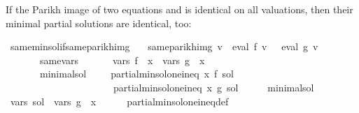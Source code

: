 \begin{isabellebody}
\begin{isamarkuptext}%
If the Parikh image of two equations  and  is identical on all valuations, then their
minimal partial solutions are identical, too:%
\end{isamarkuptext}\isamarkuptrue%
\isamarkupfalse%
\ same{\isacharunderscore}{\kern0pt}min{\isacharunderscore}{\kern0pt}sol{\isacharunderscore}{\kern0pt}if{\isacharunderscore}{\kern0pt}same{\isacharunderscore}{\kern0pt}parikh{\isacharunderscore}{\kern0pt}img{\isacharcolon}{\kern0pt}\isanewline
\ \ \ same{\isacharunderscore}{\kern0pt}parikh{\isacharunderscore}{\kern0pt}img{\isacharcolon}{\kern0pt}\ {\isachardoublequoteopen}{\isasymforall}v{\isachardot}{\kern0pt}\ {\isasymPsi}\ {\isacharparenleft}{\kern0pt}eval\ f\ v{\isacharparenright}{\kern0pt}\ {\isacharequal}{\kern0pt}\ {\isasymPsi}\ {\isacharparenleft}{\kern0pt}eval\ g\ v{\isacharparenright}{\kern0pt}{\isachardoublequoteclose}\isanewline
\ \ \ \ \ \ \ same{\isacharunderscore}{\kern0pt}vars{\isacharcolon}{\kern0pt}\ \ \ \ \ \ \ {\isachardoublequoteopen}vars\ f\ {\isacharminus}{\kern0pt}\ {\isacharbraceleft}{\kern0pt}x{\isacharbraceright}{\kern0pt}\ {\isacharequal}{\kern0pt}\ vars\ g\ {\isacharminus}{\kern0pt}\ {\isacharbraceleft}{\kern0pt}x{\isacharbraceright}{\kern0pt}{\isachardoublequoteclose}\isanewline
\ \ \ \ \ \ \ minimal{\isacharunderscore}{\kern0pt}sol{\isacharcolon}{\kern0pt}\ \ \ \ \ {\isachardoublequoteopen}partial{\isacharunderscore}{\kern0pt}min{\isacharunderscore}{\kern0pt}sol{\isacharunderscore}{\kern0pt}one{\isacharunderscore}{\kern0pt}ineq\ x\ f\ sol{\isachardoublequoteclose}\isanewline
\ \ \ \ \ \ \ \ \ \ \ \ \ \ \ \ \ \ \ \ \ \ {\isachardoublequoteopen}partial{\isacharunderscore}{\kern0pt}min{\isacharunderscore}{\kern0pt}sol{\isacharunderscore}{\kern0pt}one{\isacharunderscore}{\kern0pt}ineq\ x\ g\ sol{\isachardoublequoteclose}\isanewline
%
\isadelimproof
%
\endisadelimproof
%
\isatagproof
{}\isamarkupfalse%
\ {\isacharminus}{\kern0pt}\isanewline
\ \ \isamarkupfalse%
\ minimal{\isacharunderscore}{\kern0pt}sol\ \isamarkupfalse%
\ {\isachardoublequoteopen}vars\ sol\ {\isasymsubseteq}\ vars\ g\ {\isacharminus}{\kern0pt}\ {\isacharbraceleft}{\kern0pt}x{\isacharbraceright}{\kern0pt}{\isachardoublequoteclose}\isanewline
\ \ \ \ \isamarkupfalse%
\ partial{\isacharunderscore}{\kern0pt}min{\isacharunderscore}{\kern0pt}sol{\isacharunderscore}{\kern0pt}one{\isacharunderscore}{\kern0pt}ineq{\isacharunderscore}{\kern0pt}def\ \isamarkupfalse%

\end{isabellebody}
